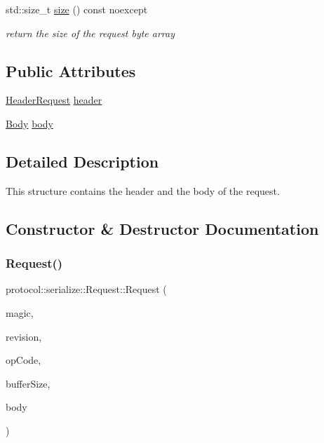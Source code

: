 \begin{DoxyCompactItemize}
\mbox{\label{structprotocol_1_1serialize_1_1_request_a2b0c8140925202096b3d3ea9610bf04f}} 
std\+::size\+\_\+t \hyperlink{structprotocol_1_1serialize_1_1_request_a2b0c8140925202096b3d3ea9610bf04f}{size} () const noexcept
\begin{DoxyCompactList}\small\item\em return the size of the request byte array \end{DoxyCompactList}\end{DoxyCompactItemize}
\subsection*{Public Attributes}
\begin{DoxyCompactItemize}
\item 
\hyperlink{structprotocol_1_1serialize_1_1_header_request}{Header\+Request} \hyperlink{structprotocol_1_1serialize_1_1_request_a9c9ea2d1e0b92441c22ac9c10a9f2e2e}{header}
\item 
\hyperlink{classprotocol_1_1serialize_1_1_body}{Body} \hyperlink{structprotocol_1_1serialize_1_1_request_a657ae52f93238a2b11a8c1d65c89d358}{body}
\end{DoxyCompactItemize}


\subsection{Detailed Description}
This structure contains the header and the body of the request. 

\subsection{Constructor \& Destructor Documentation}
\mbox{\label{structprotocol_1_1serialize_1_1_request_aa28a7123b7211e298337a179b1db4ffb}} 
\subsubsection{\texorpdfstring{Request()}{Request()}\hspace{0.1cm}{\footnotesize\ttfamily [1/2]}}
{\footnotesize\ttfamily protocol\+::serialize\+::\+Request\+::\+Request (\begin{DoxyParamCaption}\item[{char}]{magic,  }\item[{short}]{revision,  }\item[{Op\+Code}]{op\+Code,  }\item[{unsigned}]{buffer\+Size,  }\item[{std\+::initializer\+\_\+list$<$ std\+::string $>$}]{body }\end{DoxyParamCaption})}



